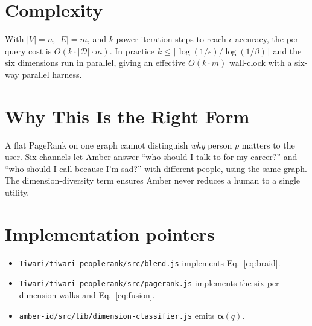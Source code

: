 \documentclass[11pt]{article}
\begin{document}
\section{Complexity}

With $|V|=n$, $|E|=m$, and $k$ power-iteration steps to reach
$\epsilon$ accuracy, the per-query cost is $O(k \cdot |\mathcal{D}| \cdot m)$.
In practice $k \le \lceil \log(1/\epsilon)/\log(1/\beta) \rceil$ and
the six dimensions run in parallel, giving an effective
$O(k\cdot m)$ wall-clock with a six-way parallel harness.

\section{Why This Is the Right Form}

A flat PageRank on one graph cannot distinguish \emph{why} person $p$
matters to the user. Six channels let Amber answer
``who should I talk to for my career?'' and
``who should I call because I'm sad?'' with different people, using
the same graph. The dimension-diversity term ensures Amber never
reduces a human to a single utility.

\section*{Implementation pointers}

\begin{itemize}
\item \texttt{Tiwari/tiwari-peoplerank/src/blend.js} implements
      Eq.~\ref{eq:braid}.
\item \texttt{Tiwari/tiwari-peoplerank/src/pagerank.js} implements
      the six per-dimension walks and Eq.~\ref{eq:fusion}.
\item \texttt{amber-id/src/lib/dimension-classifier.js} emits
      $\bm{\alpha}(q)$.
\end{itemize}
\end{document}
